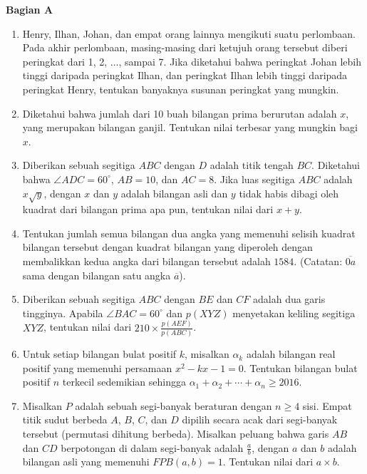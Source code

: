 \documentclass[a4paper,12pt]{article}
\begin{document}
\begin{center}
\textbf{Bagian A}
\end{center}
\begin{enumerate}
\item Henry, Ilhan, Johan, dan empat orang lainnya mengikuti suatu perlombaan. Pada akhir perlombaan, masing-masing dari ketujuh orang tersebut diberi peringkat dari 1, 2, $\ldots$, sampai 7. Jika diketahui bahwa peringkat Johan lebih tinggi daripada peringkat Ilhan, dan peringkat Ilhan lebih tinggi daripada peringkat Henry, tentukan banyaknya susunan peringkat yang mungkin.

\item Diketahui bahwa jumlah dari 10 buah bilangan prima berurutan adalah $x$, yang merupakan bilangan ganjil. Tentukan nilai terbesar yang mungkin bagi $x$.

\item Diberikan sebuah segitiga $ABC$ dengan $D$ adalah titik tengah $BC$. Diketahui bahwa $\angle ADC=60^\circ$, $AB=10$, dan $AC=8$. Jika luas segitiga $ABC$ adalah $x\sqrt{y}$, dengan $x$ dan $y$ adalah bilangan asli dan $y$ tidak habis dibagi oleh kuadrat dari bilangan prima apa pun, tentukan nilai dari $x+y$.

\item Tentukan jumlah semua bilangan dua angka yang memenuhi selisih kuadrat bilangan tersebut dengan kuadrat bilangan yang diperoleh dengan membalikkan kedua angka dari bilangan tersebut adalah $1584$. (Catatan: $\overline{0a}$ sama dengan bilangan satu angka $\overline{a}$).

\item Diberikan sebuah segitiga $ABC$ dengan $BE$ dan $CF$ adalah dua garis tingginya. Apabila $\angle BAC = 60^{\circ}$ dan $p(XYZ)$ menyetakan keliling segitiga $XYZ$, tentukan nilai dari $210 \times \frac{p(AEF)}{p(ABC)}$.

\item Untuk setiap bilangan bulat positif $k$, misalkan $\alpha_k$ adalah bilangan real positif yang memenuhi persamaan $x^2-kx-1=0$. Tentukan bilangan bulat positif $n$ terkecil sedemikian sehingga $\alpha_1+\alpha_2+\cdots+\alpha_n\geq 2016$.

\item Misalkan $P$ adalah sebuah segi-banyak beraturan dengan $n \ge 4$ sisi. Empat titik sudut berbeda $A$, $B$, $C$, dan $D$ dipilih secara acak dari segi-banyak tersebut (permutasi dihitung berbeda). Misalkan peluang bahwa garis $AB$ dan $CD$ berpotongan di dalam segi-banyak adalah $\frac{a}{b}$, dengan $a$ dan $b$ adalah bilangan asli yang memenuhi $FPB(a,b) = 1$. Tentukan nilai dari $a \times b$.


\end{enumerate}
\end{document}
